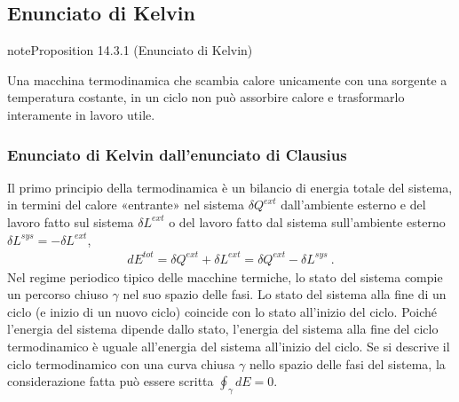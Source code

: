 \documentclass[letterpaper,10pt,italian]{jupyterBook}
\begin{document}
\subsection{Enunciato di Kelvin}
\label{\detokenize{ch/thermodynamics/heat-engine-second-principle:enunciato-di-kelvin}}\label{\detokenize{ch/thermodynamics/heat-engine-second-principle:physics-hs-thermodynamics-heat-engine-second-principle-kelvin}}\label{ch/thermodynamics/heat-engine-second-principle:proposition-0}
\begin{sphinxadmonition}{note}{Proposition 14.3.1 (Enunciato di Kelvin)}



\sphinxAtStartPar
Una macchina termodinamica che scambia calore unicamente con una sorgente a temperatura costante, in un ciclo non può assorbire calore e trasformarlo interamente in lavoro utile.
\end{sphinxadmonition}
\subsubsection*{Enunciato di Kelvin dall’enunciato di Clausius}

\sphinxAtStartPar
Il primo principio della termodinamica è un bilancio di energia totale del sistema, in termini del calore «entrante» nel sistema \(\delta Q^{ext}\) dall’ambiente esterno e del lavoro fatto sul sistema \(\delta L^{ext}\) o del lavoro fatto dal sistema sull’ambiente esterno \(\delta L^{sys} = - \delta L^{ext}\),
\begin{equation*}
\begin{split}d E^{tot} = \delta Q^{ext} + \delta L^{ext} = \delta Q^{ext} - \delta L^{sys} \ .\end{split}
\end{equation*}
\sphinxAtStartPar
Nel regime periodico tipico delle macchine termiche, lo stato del sistema compie un percorso chiuso \(\gamma\) nel suo spazio delle fasi. Lo stato del sistema alla fine di un ciclo (e inizio di un nuovo ciclo) coincide con lo stato all’inizio del ciclo. Poiché l’energia del sistema dipende dallo stato, l’energia del sistema alla fine del ciclo termodinamico è uguale all’energia del sistema all’inizio del ciclo. Se si descrive il ciclo termodinamico con una curva chiusa \(\gamma\) nello spazio delle fasi del sistema, la considerazione fatta può essere scritta \(\oint_{\gamma} dE = 0\).
\end{document}
